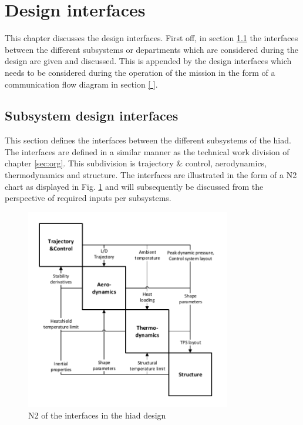 \section{Design interfaces} \label{ch:di}

This chapter discusses the design interfaces. First off, in section \ref{sec:N2} the interfaces between the different subsystems or departments which are considered during the design are given and discussed. This is appended by the design interfaces which needs to be considered during the operation of the mission in the form of a communication flow diagram in section \ref{ }.

\subsection{Subsystem design interfaces} \label{sec:N2}
This section defines the interfaces between the different subsystems of the \gls{hiad}. The interfaces are defined in a similar manner as the technical work division of chapter \ref{sec:org}. This subdivision is trajectory \& control, aerodynamics, thermodynamics and structure.  The interfaces are illustrated in the form of a N2 chart as displayed in Fig. \ref{fig:N2} and will subsequently be discussed from the perspective of required inputs per subsystems.

\begin{figure}[H]
\centering
\includegraphics[width = 0.8\textwidth]{Figure/N2.pdf}
\caption{N2 of the interfaces in the \gls{hiad} design}
\label{fig:N2}
\end{figure}

